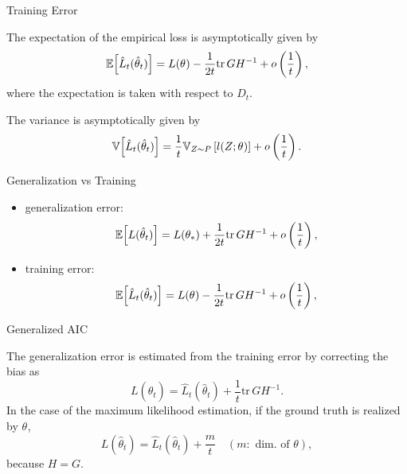 \documentclass[fleqn,aspectratio=1610]{beamer}
\begin{document}
\begin{frame}[label={sec:org109d467}]{Training Error}
\begin{theorem}[]\label{sec:org4706df7}
The expectation of the empirical loss is asymptotically given by
\begin{equation}
  \mathbb{E}\Bigl[\hat{L}_{t}(\hat\theta_{t})\Bigr]
  =L(\theta_{})
  -\frac{1}{2t}\mathrm{tr}\, GH^{-1}
  +o\left(\frac{1}{t}\right),
\end{equation}
where the expectation is taken with respect to \(D_{t}\).

The variance is asymptotically given by
\begin{equation}
  \mathbb{V}\Bigl[\hat{L}_{t}(\hat\theta_{t})\Bigr]
  =\frac{1}{t}\mathbb{V}_{Z\sim P}\left[l(Z;\theta_{})\right]
  +o\left(\frac{1}{t}\right).
\end{equation}
\end{theorem}
\end{frame}

\begin{frame}[label={sec:orgc2a7ef0}]{Generalization vs Training}
\begin{itemize}
\item generalization error:
\begin{equation}
  \mathbb{E}\Bigl[L(\hat\theta_{t})\Bigr]
  =L(\theta_*)
  +\frac{1}{2t}\mathrm{tr}\, GH^{-1}
  +o\left(\frac{1}{t}\right),
\end{equation}
\item training error:
\begin{equation}
  \mathbb{E}\Bigl[\hat{L}_{t}(\hat\theta_{t})\Bigr]
  =L(\theta_{})
  -\frac{1}{2t}\mathrm{tr}\, GH^{-1}
  +o\left(\frac{1}{t}\right),
\end{equation}
\end{itemize}
\end{frame}

\begin{frame}[label={sec:org05be7bb}]{Generalized AIC}
\begin{corollary}[Akaike, 1974]\label{sec:org933048f}
The generalization error is
estimated from the training error by correcting the bias as
\begin{equation}
  L(\hat\theta_{t})
  =
  \hat{L}_{t}(\hat\theta_{t})
  +\frac{1}{t}\mathrm{tr}\, GH^{-1}.
\end{equation}
In the case of the maximum likelihood estimation,
if the ground truth is realized by \(\theta_{}\), 
\begin{equation}
  L(\hat\theta_{t})
  =
  \hat{L}_{t}(\hat\theta_{t})
  +\frac{m}{t}\quad (m:\text{ dim.\ of }\theta),
\end{equation}
because \(H=G\).
\end{corollary}
\end{frame}
\end{document}
